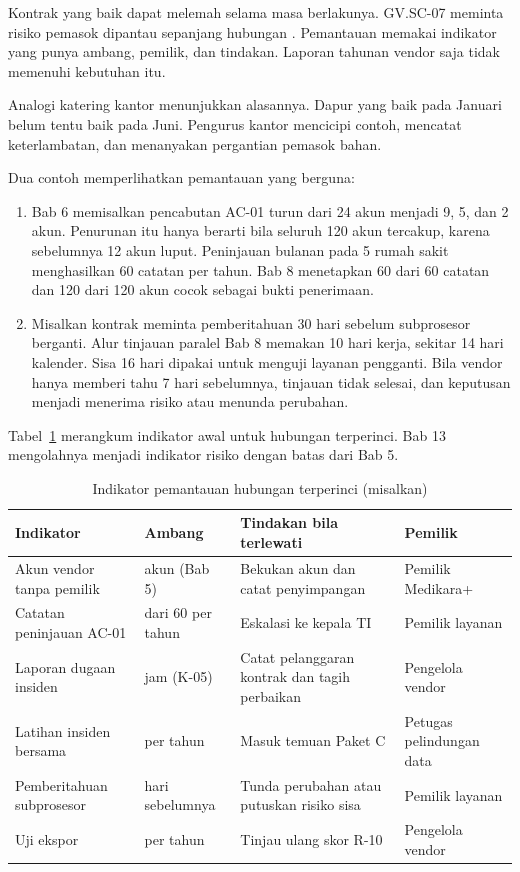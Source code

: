 Kontrak yang baik dapat melemah selama masa berlakunya. GV.SC-07 meminta risiko pemasok dipantau
sepanjang hubungan \cite{nistcsf2}. Pemantauan memakai indikator yang punya ambang, pemilik, dan
tindakan. Laporan tahunan vendor saja tidak memenuhi kebutuhan itu.

Analogi katering kantor menunjukkan alasannya. Dapur yang baik pada Januari belum tentu baik pada
Juni. Pengurus kantor mencicipi contoh, mencatat keterlambatan, dan menanyakan pergantian pemasok
bahan.

Dua contoh memperlihatkan pemantauan yang berguna:
\begin{enumerate}
  \item Bab 6 memisalkan pencabutan AC-01 turun dari 24 akun menjadi 9, 5, dan 2 akun. Penurunan
  itu hanya berarti bila seluruh 120 akun tercakup, karena sebelumnya 12 akun luput. Peninjauan
  bulanan pada 5 rumah sakit menghasilkan 60 catatan per tahun. Bab 8 menetapkan 60 dari 60 catatan
  dan 120 dari 120 akun cocok sebagai bukti penerimaan.
  \item Misalkan kontrak meminta pemberitahuan 30 hari sebelum subprosesor berganti. Alur tinjauan
  paralel Bab 8 memakan 10 hari kerja, sekitar 14 hari kalender. Sisa 16 hari dipakai untuk menguji
  layanan pengganti. Bila vendor hanya memberi tahu 7 hari sebelumnya, tinjauan tidak selesai, dan
  keputusan menjadi menerima risiko atau menunda perubahan.
\end{enumerate}

Tabel~\ref{tab:ch09-pantau} merangkum indikator awal untuk hubungan terperinci. Bab 13 mengolahnya
menjadi indikator risiko dengan batas dari Bab 5.

\begin{table}[!htb]
  \centering\small
  \caption{Indikator pemantauan hubungan terperinci (misalkan)}\label{tab:ch09-pantau}
  \begin{tabularx}{\textwidth}{|>{\raggedright\arraybackslash}X|>{\raggedright\arraybackslash}p{}|>{\raggedright\arraybackslash}X|>{\raggedright\arraybackslash}p{}|}
    \hline
    \textbf{Indikator} & \textbf{Ambang} & \textbf{Tindakan bila terlewati} & \textbf{Pemilik} \\
    \hline
    Akun vendor tanpa pemilik & 0 akun (Bab 5) & Bekukan akun dan catat penyimpangan & Pemilik
    Medikara+ \\ \hline
    Catatan peninjauan AC-01 & 60 dari 60 per tahun & Eskalasi ke kepala TI & Pemilik layanan \\
    \hline
    Laporan dugaan insiden & 12 jam (K-05) & Catat pelanggaran kontrak dan tagih perbaikan &
    Pengelola vendor \\ \hline
    Latihan insiden bersama & 2 per tahun & Masuk temuan Paket C & Petugas pelindungan data \\
    \hline
    Pemberitahuan subprosesor & 30 hari sebelumnya & Tunda perubahan atau putuskan risiko sisa &
    Pemilik layanan \\ \hline
    Uji ekspor & 1 per tahun & Tinjau ulang skor R-10 & Pengelola vendor \\ \hline
  \end{tabularx}
\end{table}

